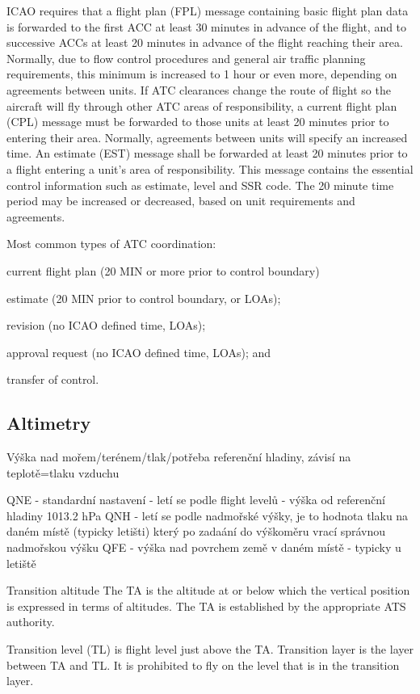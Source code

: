 ICAO requires that a flight plan (FPL) message containing basic flight plan data is forwarded to the first ACC at least 30 minutes in advance of the flight, and to successive ACCs at least 20 minutes in advance of the flight reaching their area. Normally, due to flow control procedures and general air traffic planning requirements, this minimum is increased to 1 hour or even more, depending on agreements between units. 
If ATC clearances change the route of flight so the aircraft will fly through other ATC areas of responsibility, a current flight plan (CPL) message must be forwarded to those units at least 20 minutes prior to entering their area. Normally, agreements between units will specify an increased time.
An estimate (EST) message shall be forwarded at least 20 minutes prior to a flight entering a unit’s area of responsibility. This message contains the essential control information such as estimate, level and SSR code. The 20 minute time period may be increased or decreased, based on unit requirements and agreements.
\cite[Chapter 11.3,4]{doc4444}

Most common types of ATC coordination:
\bitem
\item current flight plan (20 MIN or more prior to control boundary) 
\item estimate (20 MIN prior to control boundary, or LOAs); 
\item revision (no ICAO defined time, LOAs);
\item approval request (no ICAO defined time, LOAs); and
\item transfer of control.
\eitem

\subsection{Altimetry}
Výška nad mořem/terénem/tlak/potřeba referenční hladiny, závisí na teplotě=tlaku vzduchu

QNE - standardní nastavení - letí se podle flight levelů - výška od referenční hladiny 1013.2 hPa
QNH - letí se podle nadmořské výšky, je to hodnota tlaku na daném místě (typicky letišti) který po zadaání do výškoměru vrací správnou nadmořskou výšku
QFE - výška nad povrchem země v daném místě - typicky u letiště


Transition altitude
The TA is the altitude at or below which the vertical position is expressed in terms of altitudes. The TA is established by the appropriate ATS authority.

Transition level (TL) is flight level just above the TA. Transition layer is the layer between TA and TL. It is prohibited to fly on the level that is in the transition layer.

